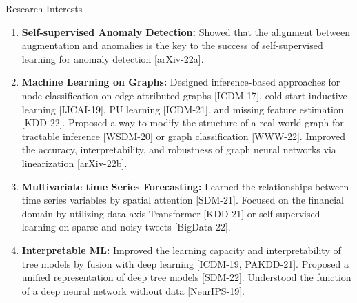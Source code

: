 \documentclass{resume} %
\begin{document}
\begin{rSection}{Research Interests}

\begin{enumerate}[noitemsep, leftmargin=*]
	\item \textbf{Self-supervised Anomaly Detection:} Showed that the alignment between augmentation and anomalies is the key to the success of self-supervised learning for anomaly detection [arXiv-22a].
	\medskip
	\item \textbf{Machine Learning on Graphs:} Designed inference-based approaches for node classification on edge-attributed graphs [ICDM-17], cold-start inductive learning [IJCAI-19], PU learning [ICDM-21], and missing feature estimation [KDD-22].
	Proposed a way to modify the structure of a real-world graph for tractable inference [WSDM-20] or graph classification [WWW-22]. 
	Improved the accuracy, interpretability, and robustness of graph neural networks via linearization [arXiv-22b].
	\medskip
	\item \textbf{Multivariate time Series Forecasting:} Learned the relationships between time series variables by spatial attention [SDM-21].
	Focused on the financial domain by utilizing data-axis Transformer [KDD-21] or self-supervised learning on sparse and noisy tweets [BigData-22].
	\medskip
	\item \textbf{Interpretable ML:} Improved the learning capacity and interpretability of tree models by fusion with deep learning [ICDM-19, PAKDD-21].
	Proposed a unified representation of deep tree models [SDM-22].
	Understood the function of a deep neural network without data [NeurIPS-19].
\end{enumerate}

\end{rSection}

\end{document}
